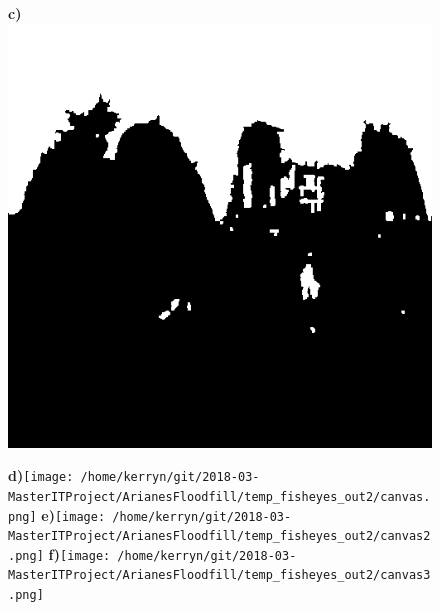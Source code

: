 \documentclass{article}
\begin{document}
\begin{figure}
\textbf{\scriptsize{c)}}\includegraphics[scale=0.20]{Images/2/FloodfillOutput.png}

\textbf{\scriptsize{d)}}\texttt{[image: /home/kerryn/git/2018-03-MasterITProject/ArianesFloodfill/temp\_fisheyes\_out2/canvas.png]}
\textbf{\scriptsize{e)}}\texttt{[image: /home/kerryn/git/2018-03-MasterITProject/ArianesFloodfill/temp\_fisheyes\_out2/canvas2.png]}
\textbf{\scriptsize{f)}}\texttt{[image: /home/kerryn/git/2018-03-MasterITProject/ArianesFloodfill/temp\_fisheyes\_out2/canvas3.png]}

\end{figure} 
\clearpage %
\end{document}
